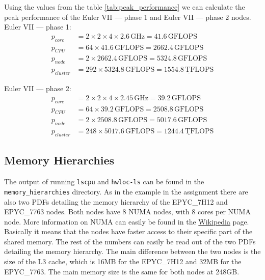 \documentclass[unicode,11pt,a4paper,oneside,numbers=endperiod,openany]{scrartcl}
\begin{document}
Using the values from the table \ref{tab:peak_performance} we can calculate the peak performance of the Euler VII — phase 1 and Euler VII — phase 2 nodes.
\\

Euler VII — phase 1:
\begin{align*}
    p_{core}    & = 2 \times 2 \times 4 \times 2.6 \, \text{GHz}  =     41.6 \, \text{GFLOPS}               \\
    p_{CPU}     & = 64 \times 41.6 \, \text{GFLOPS}                  =  2662.4 \, \text{GFLOPS}             \\
    p_{node}    & = 2 \times 2662.4 \, \text{GFLOPS}                =   5324.8 \, \text{GFLOPS}             \\
    p_{cluster} & = 292 \times 5324.8 \, \text{GFLOPS}               =  \underline{1554.8 \, \text{TFLOPS}}
\end{align*}

Euler VII — phase 2:
\begin{align*}
    p_{core}    & = 2 \times 2 \times 4 \times 2.45 \, \text{GHz}  = 39.2 \, \text{GFLOPS}               \\
    p_{CPU}     & = 64 \times 39.2 \, \text{GFLOPS}                = 2508.8 \, \text{GFLOPS}             \\
    p_{node}    & = 2 \times 2508.8 \, \text{GFLOPS}               = 5017.6 \, \text{GFLOPS}             \\
    p_{cluster} & = 248 \times 5017.6 \, \text{GFLOPS}             = \underline{1244.4 \, \text{TFLOPS}}
\end{align*}

\subsection{Memory Hierarchies}

The output of running \texttt{lscpu} and \texttt{hwloc-ls} can be found in the \texttt{memory\_hierarchies} directory. As in the example in the assignment there are also two PDFs detailing the memory hierarchy of the EPYC\_7H12 and EPYC\_7763 nodes. Both nodes have 8 NUMA nodes, with 8 cores per NUMA node. More information on NUMA can easily be found in the \href{https://en.wikipedia.org/wiki/Non-uniform_memory_access}{Wikipedia} page. Basically it means that the nodes have faster access to their specific part of the shared memory. The rest of the numbers can easily be read out of the two PDFs detailing the memory hierarchy. The main difference between the two nodes is the size of the L3 cache, which is 16MB for the EPYC\_7H12 and 32MB for the EPYC\_7763. The main memory size is the same for both nodes at 248GB.
\end{document}
